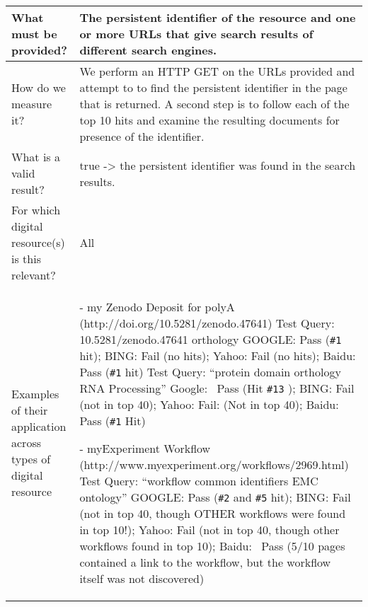 \documentclass[english]{article}
\begin{document}
\begin{longtable}{|p{5cm}|p{9cm}|}
\hline
What must be provided? &  


The persistent identifier of the resource and one or more URLs that give search results of different search engines.



\\



\hline
How do we measure it? &  


We perform an HTTP GET on the URLs provided and attempt to to find the persistent identifier in the page that is returned. A second step is to follow each of the top 10 hits and examine the resulting documents for presence of the identifier. 


\\



\hline
What is a valid result? &  


true -> the persistent identifier was found in the search results.


\\



\hline
For which digital resource(s) is this relevant? &  All\\



\hline
Examples of their application across types of digital resource &  


- my Zenodo Deposit for polyA \newline 
(http://doi.org/10.5281/zenodo.47641)\newline 
Test Query:  10.5281/zenodo.47641  orthology\newline 
GOOGLE: Pass (\verb|#1| hit);  BING:  Fail (no hits); Yahoo: Fail (no hits); Baidu: Pass (\verb|#1| hit) 
\newline 
Test Query: “protein domain orthology RNA Processing”\newline 
Google:  ~Pass (Hit \verb|#13| ); BING:  Fail (not in top 40); Yahoo:  Fail:  (Not in top 40); Baidu: Pass (\verb|#1| Hit)\newline 

- myExperiment Workflow (http://www.myexperiment.org/workflows/2969.html)\newline 
Test Query: “workflow common identifiers EMC ontology”\newline 
GOOGLE:  Pass (\verb|#2| and \verb|#5| hit); BING: Fail (not in top 40, though OTHER workflows were found in top 10!); Yahoo: Fail (not in top 40, though other workflows found in top 10); Baidu: ~Pass (5/10 pages contained a link to the workflow, but the workflow itself was not discovered)\newline 


\end{longtable}
\end{document}
